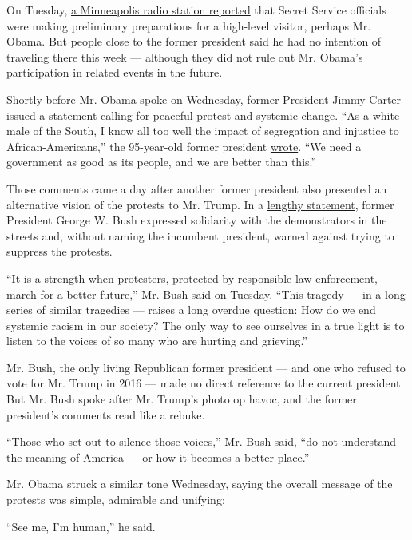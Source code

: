 On Tuesday,
\href{https://www.kvrr.com/2020/06/02/twin-cities-law-enforcement-briefed-on-possible-obama-pence-visits-this-week/}{a
Minneapolis radio station reported} that Secret Service officials were
making preliminary preparations for a high-level visitor, perhaps Mr.
Obama. But people close to the former president said he had no intention
of traveling there this week --- although they did not rule out Mr.
Obama's participation in related events in the future.

Shortly before Mr. Obama spoke on Wednesday, former President Jimmy
Carter issued a statement calling for peaceful protest and systemic
change. ``As a white male of the South, I know all too well the impact
of segregation and injustice to African-Americans,'' the 95-year-old
former president
\href{https://www.cartercenter.org/news/pr/2020/statement-060320.html}{wrote}.
``We need a government as good as its people, and we are better than
this.''

Those comments came a day after another former president also presented
an alternative vision of the protests to Mr. Trump. In a
\href{https://www.bushcenter.org/about-the-center/newsroom/press-releases/2020/06/statement-by-president-george-w-bush.html}{lengthy
statement}, former President George W. Bush expressed solidarity with
the demonstrators in the streets and, without naming the incumbent
president, warned against trying to suppress the protests.

``It is a strength when protesters, protected by responsible law
enforcement, march for a better future,'' Mr. Bush said on Tuesday.
``This tragedy --- in a long series of similar tragedies --- raises a
long overdue question: How do we end systemic racism in our society? The
only way to see ourselves in a true light is to listen to the voices of
so many who are hurting and grieving.''

Mr. Bush, the only living Republican former president --- and one who
refused to vote for Mr. Trump in 2016 --- made no direct reference to
the current president. But Mr. Bush spoke after Mr. Trump's photo op
havoc, and the former president's comments read like a rebuke.

``Those who set out to silence those voices,'' Mr. Bush said, ``do not
understand the meaning of America --- or how it becomes a better
place.''

Mr. Obama struck a similar tone Wednesday, saying the overall message of
the protests was simple, admirable and unifying:

``See me, I'm human,'' he said.

